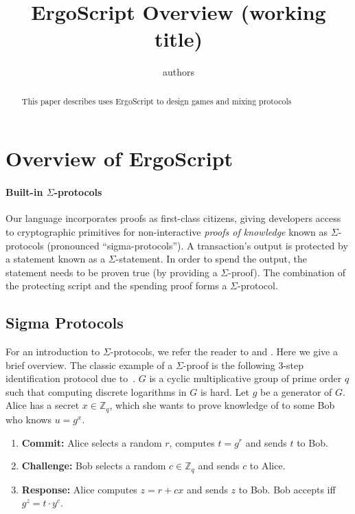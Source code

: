 \documentclass[11pt]{article}
\newcommand{\langname}{ErgoScript\xspace}
\begin{document}
\title{\langname Overview (working title)}

\author{authors}


\maketitle


\begin{abstract}
This paper describes uses \langname to design games and mixing protocols
\end{abstract}
\section{Overview of \langname}

\paragraph{Built-in $\Sigma$-protocols}
Our language incorporates proofs as first-class citizens, giving developers access to cryptographic primitives for non-interactive {\em proofs of knowledge} known as $\Sigma$-protocols (pronounced ``sigma-protocols''). A transaction's output is protected by a statement known as a $\Sigma$-statement. In order to spend the output, the statement needs to be proven true (by providing a $\Sigma$-proof). The combination of the protecting script and the spending proof forms a $\Sigma$-protocol.

\subsection{Sigma Protocols}
For an introduction to $\Sigma$-protocols, we refer the reader to \cite{Dam10} and \cite[Chapter 6]{HL10}. Here we give a brief overview. The classic example of a $\Sigma$-proof is the following 3-step identification protocol due to~\cite{Sch91}. $G$ is a cyclic multiplicative group of prime order $q$ such that computing discrete logarithms in $G$ is hard. Let $g$ be a generator of $G$. Alice has a secret $x \in \mathbb{Z}_q$, which she wants to prove knowledge of to some Bob who knows $u = g^x$.
\begin{enumerate}
	\item \textbf{Commit:} Alice selects a random $r$, computes $t = g^r$ and sends $t$ to Bob.
	\item \textbf{Challenge:} Bob selects a random $c\in\mathbb{Z}_q$ and sends $c$ to Alice.
	\item \textbf{Response:} Alice computes $z = r + cx$ and sends $z$ to Bob. Bob accepts iff $g^z = t\cdot y^c$.
\end{enumerate}
\end{document}
